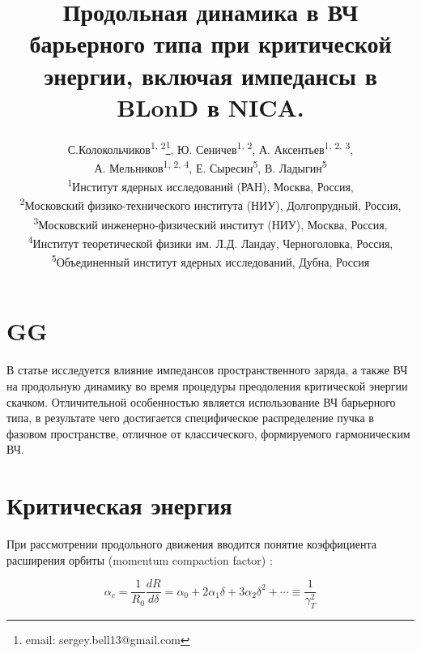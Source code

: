 \documentclass[a4paper,
               keeplastbox,   %
               ]{jacow}
\renewcommand\abstractname{GG}
\begin{document}
\title{Продольная динамика в ВЧ барьерного типа при критической энергии, включая импедансы в BLonD в NICA.}

\author{С.Колокольчиков\textsuperscript{1, 2}\thanks{email: sergey.bell13@gmail.com}, Ю. Сеничев\textsuperscript{1, 2}, А. Аксентьев\textsuperscript{1, 2, 3}, \\ А. Мельников\textsuperscript{1, 2, 4}, Е. Сыресин\textsuperscript{5}, В. Ладыгин\textsuperscript{5}\\
	\textsuperscript{1}Институт ядерных исследований (РАН), Москва, Россия,\\
	\textsuperscript{2}Московский физико-технического института (НИУ), Долгопрудный, Россия,\\
	\textsuperscript{3}Московский инженерно-физический институт (НИУ), Москва, Россия,\\
	\textsuperscript{4}Институт теоретической физики им. Л.Д. Ландау, Черноголовка, Россия,\\
	\textsuperscript{5}Объединенный институт ядерных исследований, Дубна, Россия\\}

\maketitle

\section{\abstractname}
\par В статье исследуется влияние импедансов пространственного заряда, а также ВЧ на продольную динамику во время процедуры преодоления критической энергии скачком. Отличительной особенностью является использование ВЧ барьерного типа, в результате чего достигается специфическое распределение пучка в фазовом пространстве, отличное от классического, формируемого гармоническим ВЧ.

\section{Критическая энергия}

\par При рассмотрении продольного движения вводится понятие коэффициента расширения орбиты (momentum compaction factor) \cite{Lee}:

\begin{equation}
\alpha_c=\frac{1}{R_0} \frac{d R}{d \delta}=\alpha_0+2 \alpha_1 \delta+3 \alpha_2 \delta^2+\cdots \equiv \frac{1}{\gamma_T^2}
\label{alpha}
\end{equation}
\end{document}
